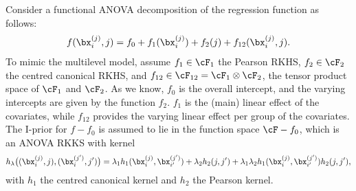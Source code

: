 Consider a functional ANOVA decomposition of the regression function as follows:
\begin{align}\label{eq:anovamultilevel}
  f(\bx_i^{(j)}, j) = f_0 + f_1(\bx_i^{(j)}) + f_2(j) + f_{12}(\bx_i^{(j)}, j).  
\end{align}
To mimic the multilevel model, assume $f_1\in\cF_1$ the Pearson RKHS, $f_2\in\cF_2$ the centred canonical RKHS, and $f_{12} \in \cF_{12} = \cF_1 \otimes \cF_2$, the tensor product space of $\cF_1$ and $\cF_2$.
As we know, $f_0$ is the overall intercept, and the varying intercepts are given by the function $f_2$.
$f_1$ is the (main) linear effect of the covariates, while $f_{12}$ provides the varying linear effect per group of the covariates.
The I-prior for $f-f_0$ is assumed to lie in the function space $\cF-f_0$, which is an ANOVA RKKS with kernel
\[
  h_\lambda\big((\bx_i^{(j)},j),(\bx_i^{(j')},j')\big) = \lambda_1 h_1(\bx_i^{(j)},\bx_{i'}^{(j')}) + \lambda_2 h_2(j,j') + \lambda_1\lambda_2 h_1(\bx_i^{(j)},\bx_{i'}^{(j')})h_2(j,j'),
\]
with $h_1$ the centred canonical kernel and $h_2$ the Pearson kernel.

